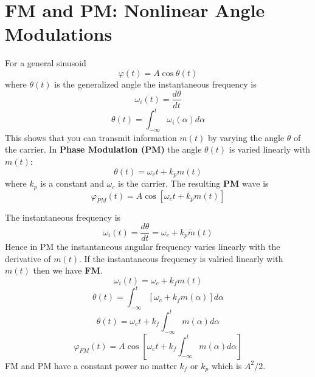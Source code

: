 \documentclass{article}
\begin{document}
    \section{FM and PM: Nonlinear Angle Modulations}
    For a general sinusoid
    \begin{equation}
        \varphi(t) = A\cos\theta(t)
    \end{equation}
    where $\theta(t)$ is the generalized angle the instantaneous frequency is
    \begin{equation}
        \omega_i(t) = \frac{d\theta}{dt}
    \end{equation}
    \begin{equation}
        \theta(t) = \int_{-\infty}^{t}\omega_i(\alpha)d\alpha
    \end{equation}
    This shows that you can transmit information $m(t)$ by varying the angle $\theta$ of the carrier. In \textbf{Phase Modulation (PM)} the angle
    $\theta(t)$ is varied linearly with $m(t)$:
    \begin{equation}
        \theta(t) = \omega_ct + k_pm(t)
    \end{equation}
    where $k_p$ is a constant and $\omega_c$ is the carrier. The resulting \textbf{PM} wave is
    \begin{equation}
        \varphi_{PM}(t) = A\cos[\omega_ct + k_pm(t)]
    \end{equation}

    The instantaneous frequency is 
    \begin{equation}
        \omega_i(t) = \frac{d\theta}{dt} = \omega_c + k_p\dot{m}(t)
    \end{equation}
    Hence in PM the instantaneous angular frequency varies linearly with the derivative of $m(t)$. If the instantaneous frequency is valried linearly with
    $m(t)$ then we have \textbf{FM}. 
    \begin{equation}
        \omega_i(t) = \omega_c + k_fm(t)
    \end{equation}
    \begin{equation}
        \theta(t) = \int_{-\infty}^{t}[\omega_c + k_fm(\alpha)]d\alpha
    \end{equation}
    \begin{equation}
        \theta(t) = \omega_ct + k_f\int_{-\infty}^{t}m(\alpha)d\alpha
    \end{equation}
    \begin{equation}
        \varphi_{FM}(t) = A\cos[\omega_ct + k_f\int_{-\infty}^{t}m(\alpha)d\alpha]
    \end{equation}
    FM and PM have a constant power no matter $k_f$ or $k_p$ which is $A^2/2$.
\end{document}
